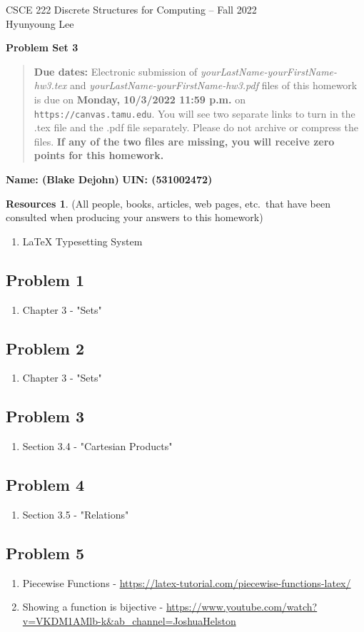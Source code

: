 \documentclass{article}
\theoremstyle{definition}
\newtheorem*{resources}{Resources}
\newcommand{\name}[2]{\noindent\textbf{Name: #1}\hfill \textbf{UIN: #2}
  \newcommand{\myName}{#1}
  \newcommand{\myUIN}{#2}
}
\newcommand{\problemset}[1]{\begin{center}\textbf{Problem Set #1}\end{center}}
\newcommand{\duedate}[1]{\begin{quote}\textbf{Due dates:} Electronic
    submission of \textsl{yourLastName-yourFirstName-hw3.tex} and 
    \textsl{yourLastName-yourFirstName-hw3.pdf} files of this homework is due on
    \textbf{#1} on \texttt{https://canvas.tamu.edu}. You will see two separate links
    to turn in the .tex file and the .pdf file separately. Please do not archive or compress the files.  
    \textbf{If any of the two files are missing, you will receive zero points for this homework.}\end{quote} }
\begin{document}
\begin{center}
{\large
CSCE 222 Discrete Structures for Computing -- Fall 2022\\[.5ex]
Hyunyoung Lee\\}
\end{center}
\problemset{3}
\duedate{Monday, 10/3/2022 11:59 p.m.}
\name{ (Blake Dejohn) }{ (531002472) }  %
\begin{resources} (All people, books, articles, web pages, etc.\ that
  have been consulted when producing your answers to this homework)
\begin{enumerate}
\subsection*{Resources Overall (used for the whole document)}
\item LaTeX Typesetting System
\end{enumerate}
\subsection*{Problem 1}
\begin{enumerate}
\item Chapter 3 - "Sets"
\end{enumerate}
\subsection*{Problem 2}
\begin{enumerate}
\item Chapter 3 - "Sets"
\end{enumerate}
\subsection*{Problem 3}
\begin{enumerate}
\item Section 3.4 - "Cartesian Products"
\end{enumerate}
\subsection*{Problem 4}
\begin{enumerate}
\item Section 3.5 - "Relations"
\end{enumerate}
\subsection*{Problem 5}
\begin{enumerate}
\item Piecewise Functions - \url{https://latex-tutorial.com/piecewise-functions-latex/}
\item Showing a function is bijective - \url{https://www.youtube.com/watch?v=VKDM1AMlb-k&ab_channel=JoshuaHelston}
\end{enumerate}

\end{resources}
\end{document}
